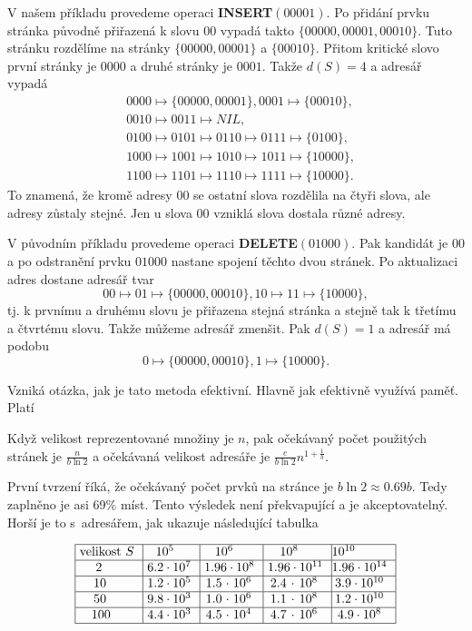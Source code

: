 \documentclass[a4paper,12pt]{article}
\begin{document}
V našem příkladu provedeme operaci 
{\bf INSERT$(00001)$}. Po přidání prvku stránka původně 
přiřazená k slovu $00$ vypadá takto $\{00000,00001,0001
0\}$. Tuto 
stránku rozdělíme na  
strán\-ky $\{00000,00001\}$ a $\{00010\}$. Přitom kritické slovo 
první strán\-ky je $0000$ a druhé strán\-ky je $0001$. Takže 
$d(S)=4$ a adresář vypadá 
\begin{align*}&0000\mapsto \{00000,00001\},0001\mapsto \{00010\},\\
&0010\mapsto 0011\mapsto NIL,\\
&0100\mapsto 0101\mapsto 0110\mapsto 0111\mapsto \{0100\},\\
&1000\mapsto 1001\mapsto 1010\mapsto 1011\mapsto \{10000\},\\
&1100\mapsto 1101\mapsto 1110\mapsto 1111\mapsto \{10000\}.\end{align*}
To znamená, že kromě adresy $00$ se ostatní slova rozdělila 
na čtyři slova, ale adresy zůstaly stejné. Jen u 
slova 00 vzniklá slova dostala různé adresy.

V původním příkladu 
provedeme operaci {\bf DELETE$(01000)$}. Pak kandidát je $00$ a po 
odstranění prvku $01000$ nastane spojení těchto dvou 
stránek. Po aktualizaci adres dostane adresář tvar
$$00\mapsto 01\mapsto \{00000,00010\},10\mapsto 11\mapsto \{10000
\},$$
tj. k prvnímu a druhému slovu je přiřazena stejná 
stránka a stejně tak k třetímu a čtvrtému slovu. Takže 
můžeme adresář zmenšit. Pak $d(S)=1$ a adresář má 
podobu  
$$0\mapsto \{00000,00010\},1\mapsto \{10000\}.$$

Vzniká otázka, jak je tato metoda efektivní. 
Hlavně jak efektivně využívá paměť. Platí

\begin{veta}Když velikost repre\-zentované množiny je $
n$, pak 
očekávaný počet použitých stránek je 
$\frac n{b\ln2}$ a očekáva\-ná velikost adresáře je $\frac 
e{b\ln2}n^{1+\frac 1b}$. 
\end{veta}

První tvrzení říká, že očekávaný počet 
prvků na stránce je $b\ln2\approx 0.69b$. Tedy zaplněno 
je asi 69\% míst. Tento výsledek není překvapující a je 
akceptovatelný. Horší je to s~adresářem, jak ukazuje 
následující tabulka

$$\vtop{\offinterlineskip\halign {\strut\vrule\ # & \vrule\ # & \vrule\ # & \vrule\ # & \vrule \hfil # \hfil \vrule\cr\noalign{\hrule}velikost $S$ & $10^5$ & $10^6$ & $10^8$ & $10^{10}$ \hfill \cr\noalign{\hrule} 2 & $6.2\cdot10^7$ & $1.96\cdot10^8$ & $1.96\cdot10^{11}$ & $1.96\cdot10^{14}$ \cr\noalign{\hrule} $10$ & $1.2\cdot10^5$ & $1.5\cdot10^6$ & $2.4\cdot10^8$ & $3.9\cdot10^{10}$ \cr\noalign{\hrule} $50$ & $9.8\cdot10^3$ & $1.0\cdot10^6$ & $1.1\cdot10^8$ & $1.2\cdot10^{10}$ \cr\noalign{\hrule} $100$ & $4.4\cdot10^3$ & $4.5\cdot10^4$ & $4.7\cdot10^6$ & $4.9\cdot10^8$ \cr\noalign{\hrule}}}$$
\end{document}

